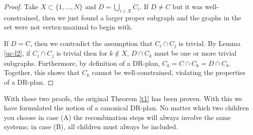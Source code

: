 


\begin{proof}
Take $X\subset \{1,\ldots,N\}$ and $D=\bigcup_{i\in X}{C_i}$. If $D\neq C$ but it was well-constrained, then we just found a larger proper subgraph and the graphs in the set were not vertex-maximal to begin with.

If $D= C$, then we contradict the assumption that $C_i \cap C_j$ is trivial. By Lemma \ref{uc-l2}, if $C_i \cap C_j$ is trivial then for $k\notin X$, $D\cap C_k$ must be one or more trivial subgraphs. Furthermore, by definition of a DR-plan, $C_k=C\cap C_k=D\cap C_k$. Together, this shows that $C_k$ cannot be well-constrained, violating the properties of a DR-plan.
\end{proof}



With these two proofs, the original Theorem \ref{t1} has been proven. With this we have formulated the notion of a canonical DR-plan.
No matter which two children you choose in case (A) the recombination steps will always involve the same systems; in case (B), all children must always be included.

